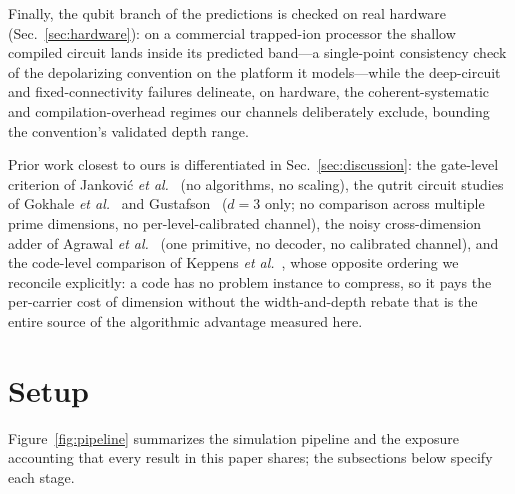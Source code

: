 \documentclass[aps,pra,reprint,superscriptaddress,nofootinbib,floatfix]{revtex4-2}
\begin{document}
Finally, the qubit branch of the predictions is checked on real
hardware (Sec.~\ref{sec:hardware}): on a commercial trapped-ion
processor the shallow compiled circuit lands inside its predicted
band---a single-point consistency check of the depolarizing
convention on the platform it models---while the deep-circuit and
fixed-connectivity failures delineate, on hardware, the
coherent-systematic and compilation-overhead regimes our channels
deliberately exclude, bounding the convention's validated depth range.

Prior work closest to ours is differentiated in
Sec.~\ref{sec:discussion}: the gate-level criterion of Jankovi\'c
\emph{et al.}~\cite{jankovic2024} (no algorithms, no scaling), the qutrit
circuit studies of Gokhale \emph{et al.}~\cite{gokhale2019} and
Gustafson~\cite{gustafson2022} ($d=3$ only; no comparison across
multiple prime dimensions, no per-level-calibrated channel), the
noisy cross-dimension adder of Agrawal \emph{et
al.}~\cite{agrawal2025} (one primitive, no decoder, no calibrated
channel), and the
code-level comparison of Keppens \emph{et al.}~\cite{keppens2025}, whose
opposite ordering we reconcile explicitly: a code has no problem instance
to compress, so it pays the per-carrier cost of dimension without the
width-and-depth rebate that is the entire source of the algorithmic
advantage measured here.

\section{Setup}
\label{sec:setup}

Figure~\ref{fig:pipeline} summarizes the simulation pipeline and the
exposure accounting that every result in this paper shares; the
subsections below specify each stage.
\end{document}
